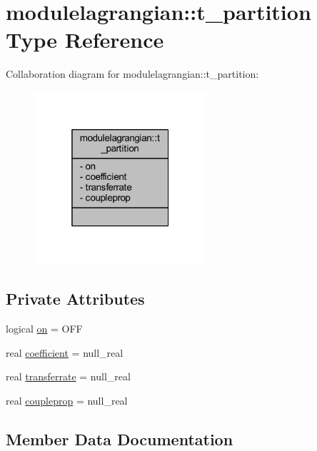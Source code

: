 \hypertarget{structmodulelagrangian_1_1t__partition}{}\section{modulelagrangian\+:\+:t\+\_\+partition Type Reference}
\label{structmodulelagrangian_1_1t__partition}


Collaboration diagram for modulelagrangian\+:\+:t\+\_\+partition\+:\nopagebreak
\begin{figure}[H]
\begin{center}
\leavevmode
\includegraphics[width=181pt]{structmodulelagrangian_1_1t__partition__coll__graph}
\end{center}
\end{figure}
\subsection*{Private Attributes}
\begin{DoxyCompactItemize}
\item 
logical \mbox{\hyperlink{structmodulelagrangian_1_1t__partition_a8e92f3ae8cdc30510ff58f16f33396f0}{on}} = O\+FF
\item 
real \mbox{\hyperlink{structmodulelagrangian_1_1t__partition_a9543c530d853632190391208bad3f8a5}{coefficient}} = null\+\_\+real
\item 
real \mbox{\hyperlink{structmodulelagrangian_1_1t__partition_a207139c091f044992398b74cf7f1d351}{transferrate}} = null\+\_\+real
\item 
real \mbox{\hyperlink{structmodulelagrangian_1_1t__partition_a7514110f6a8955d1143a8e0991168986}{coupleprop}} = null\+\_\+real
\end{DoxyCompactItemize}


\subsection{Member Data Documentation}
\mbox{\label{structmodulelagrangian_1_1t__partition_a9543c530d853632190391208bad3f8a5}} 
